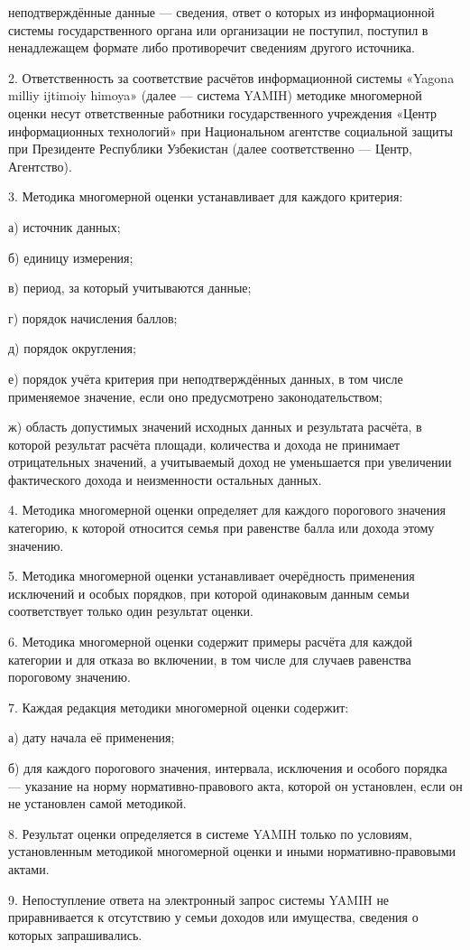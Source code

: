\documentclass[14pt,a4paper]{extarticle}
\newcommand{\norm}[1]{\par\noindent\hspace*{1.27cm}#1. }
\newcommand{\sub}[1]{\par\noindent\hspace*{1.27cm}#1 }
\begin{document}
неподтверждённые данные — сведения, ответ о которых из информационной системы государственного органа или организации не поступил, поступил в ненадлежащем формате либо противоречит сведениям другого источника.

\norm{2}Ответственность за соответствие расчётов информационной системы «Yagona milliy ijtimoiy himoya» (далее — система YAMIH) методике многомерной оценки несут ответственные работники государственного учреждения «Центр информационных технологий» при Национальном агентстве социальной защиты при Президенте Республики Узбекистан (далее соответственно — Центр, Агентство).

\norm{3}Методика многомерной оценки устанавливает для каждого критерия:
\sub{а)}источник данных;
\sub{б)}единицу измерения;
\sub{в)}период, за который учитываются данные;
\sub{г)}порядок начисления баллов;
\sub{д)}порядок округления;
\sub{е)}порядок учёта критерия при неподтверждённых данных, в том числе применяемое значение, если оно предусмотрено законодательством;
\sub{ж)}область допустимых значений исходных данных и результата расчёта, в которой результат расчёта площади, количества и дохода не принимает отрицательных значений, а учитываемый доход не уменьшается при увеличении фактического дохода и неизменности остальных данных.

\norm{4}Методика многомерной оценки определяет для каждого порогового значения категорию, к которой относится семья при равенстве балла или дохода этому значению.

\norm{5}Методика многомерной оценки устанавливает очерёдность применения исключений и особых порядков, при которой одинаковым данным семьи соответствует только один результат оценки.

\norm{6}Методика многомерной оценки содержит примеры расчёта для каждой категории и для отказа во включении, в том числе для случаев равенства пороговому значению.

\norm{7}Каждая редакция методики многомерной оценки содержит:
\sub{а)}дату начала её применения;
\sub{б)}для каждого порогового значения, интервала, исключения и особого порядка — указание на норму нормативно-правового акта, которой он установлен, если он не установлен самой методикой.

\norm{8}Результат оценки определяется в системе YAMIH только по условиям, установленным методикой многомерной оценки и иными нормативно-правовыми актами.

\norm{9}Непоступление ответа на электронный запрос системы YAMIH не приравнивается к отсутствию у семьи доходов или имущества, сведения о которых запрашивались.
\end{document}
